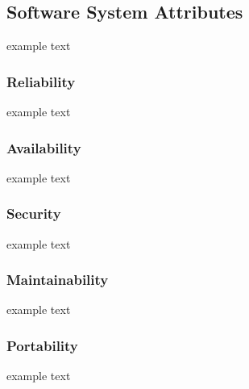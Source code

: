 \subsection{Software System Attributes}
	example text
	
	\subsubsection{Reliability}
		example text
	\subsubsection{Availability}
		example text
	\subsubsection{Security}
		example text
	\subsubsection{Maintainability}
		example text
	\subsubsection{Portability}
		example text